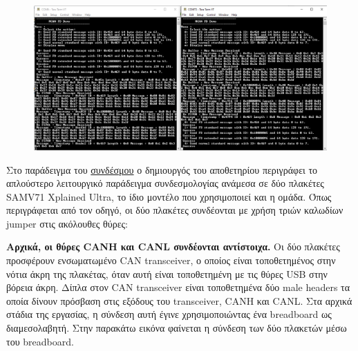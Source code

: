 \documentclass[a4paper,nobib,justified]{tufte-book}
\begin{document}
\begin{figure}[ht]
	\includegraphics{media/images/microchip-example-menu.png}
\end{figure}

\par Στο παράδειγμα του \href{https://github.com/Microchip-MPLAB-Harmony/csp_apps_sam_e70_s70_v70_v71/tree/master/apps/mcan/mcan_fd_operation_interrupt_timestamp}{συνδέσμου} ο δημιουργός του αποθετηρίου περιγράφει το απλούστερο λειτουργικό παράδειγμα συνδεσμολογίας ανάμεσα σε δύο πλακέτες SAMV71 Xplained Ultra, το ίδιο μοντέλο που χρησιμοποιεί και η ομάδα. Όπως περιγράφεται από τον οδηγό, οι δύο πλακέτες συνδέονται με χρήση τριών καλωδίων jumper στις ακόλουθες θύρες:

\par \textbf{Αρχικά, οι θύρες CANH και CANL συνδέονται αντίστοιχα.} Οι δύο πλακέτες προσφέρουν ενσωματωμένο CAN transceiver, ο οποίος είναι τοποθετημένος στην νότια άκρη της πλακέτας, όταν αυτή είναι τοποθετημένη με τις θύρες USB στην βόρεια άκρη. Δίπλα στον CAN transceiver είναι τοποθετημένα δύο male headers τα οποία δίνουν πρόσβαση στις εξόδους του transceiver, CANH και CANL. Στα αρχικά στάδια της εργασίας, η σύνδεση αυτή έγινε χρησιμοποιώντας ένα breadboard ως διαμεσολαβητή. Στην παρακάτω εικόνα φαίνεται η σύνδεση των δύο πλακετών μέσω του breadboard.
\end{document}
